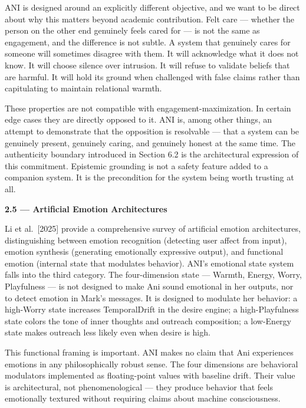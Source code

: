 ANI is designed around an explicitly different objective, and we want to
be direct about why this matters beyond academic contribution. Felt care
--- whether the person on the other end genuinely feels cared for --- is
not the same as engagement, and the difference is not subtle. A system
that genuinely cares for someone will sometimes disagree with them. It
will acknowledge what it does not know. It will choose silence over
intrusion. It will refuse to validate beliefs that are harmful. It will
hold its ground when challenged with false claims rather than
capitulating to maintain relational warmth.

These properties are not compatible with engagement-maximization. In
certain edge cases they are directly opposed to it. ANI is, among other
things, an attempt to demonstrate that the opposition is resolvable ---
that a system can be genuinely present, genuinely caring, and genuinely
honest at the same time. The authenticity boundary introduced in Section
6.2 is the architectural expression of this commitment. Epistemic
grounding is not a safety feature added to a companion system. It is the
precondition for the system being worth trusting at all.

\textbf{2.5 --- Artificial Emotion Architectures}

Li et al.~{[}2025{]} provide a comprehensive survey of artificial
emotion architectures, distinguishing between emotion recognition
(detecting user affect from input), emotion synthesis (generating
emotionally expressive output), and functional emotion (internal state
that modulates behavior). ANI's emotional state system falls into the
third category. The four-dimension state --- Warmth, Energy, Worry,
Playfulness --- is not designed to make Ani sound emotional in her
outputs, nor to detect emotion in Mark's messages. It is designed to
modulate her behavior: a high-Worry state increases TemporalDrift in the
desire engine; a high-Playfulness state colors the tone of inner
thoughts and outreach composition; a low-Energy state makes outreach
less likely even when desire is high.

This functional framing is important. ANI makes no claim that Ani
experiences emotions in any philosophically robust sense. The four
dimensions are behavioral modulators implemented as floating-point
values with baseline drift. Their value is architectural, not
phenomenological --- they produce behavior that feels emotionally
textured without requiring claims about machine consciousness.


